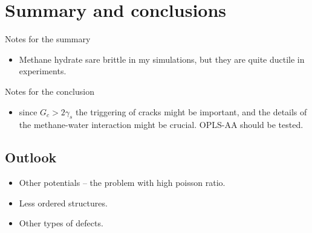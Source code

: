 \chapter{Summary and conclusions}

Notes for the summary
\begin{itemize}
\item Methane hydrate sare brittle in my simulations, but they are quite ductile in experiments.
\end{itemize}

Notes for the conclusion
\begin{itemize}
\item since $G_c > 2\gamma_s$ the triggering of cracks might be important, and the details of the methane-water interaction might be crucial. OPLS-AA should be tested.
\end{itemize}


\section{Outlook}
\begin{itemize}
\item Other potentials – the problem with high poisson ratio.
\item Less ordered structures.
\item Other types of defects.
\end{itemize}